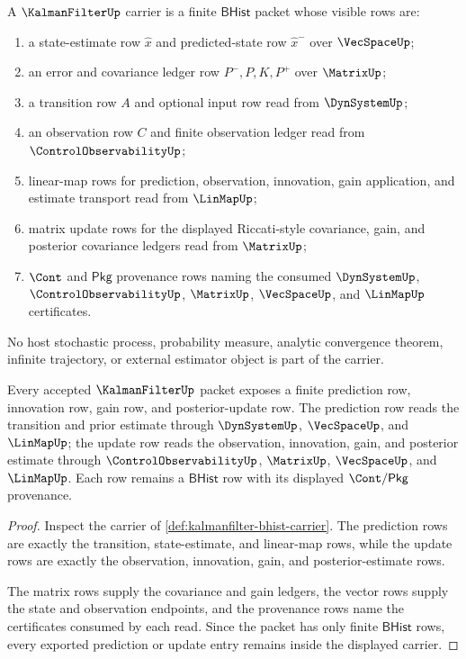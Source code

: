 \begin{definition}
\label{def:kalmanfilter-bhist-carrier}
A $\KalmanFilterUp$ carrier is a finite $\mathsf{BHist}$ packet whose visible rows are:
\begin{enumerate}
\item a state-estimate row $\widehat{x}$ and predicted-state row $\widehat{x}^{-}$ over $\VecSpaceUp$;
\item an error and covariance ledger row $P^{-},P,K,P^{+}$ over $\MatrixUp$;
\item a transition row $A$ and optional input row read from $\DynSystemUp$;
\item an observation row $C$ and finite observation ledger read from $\ControlObservabilityUp$;
\item linear-map rows for prediction, observation, innovation, gain application, and estimate transport read from $\LinMapUp$;
\item matrix update rows for the displayed Riccati-style covariance, gain, and posterior covariance ledgers read from $\MatrixUp$;
\item $\Cont$ and $\mathsf{Pkg}$ provenance rows naming the consumed $\DynSystemUp$, $\ControlObservabilityUp$, $\MatrixUp$, $\VecSpaceUp$, and $\LinMapUp$ certificates.
\end{enumerate}
No host stochastic process, probability measure, analytic convergence theorem, infinite trajectory, or external estimator object is part of the carrier.
\end{definition}

\begin{theorem}
\label{thm:kalmanfilter-prediction-update-obligation}
Every accepted $\KalmanFilterUp$ packet exposes a finite prediction row, innovation row, gain row, and posterior-update row. The prediction row reads the transition and prior estimate through $\DynSystemUp$, $\VecSpaceUp$, and $\LinMapUp$; the update row reads the observation, innovation, gain, and posterior estimate through $\ControlObservabilityUp$, $\MatrixUp$, $\VecSpaceUp$, and $\LinMapUp$. Each row remains a $\mathsf{BHist}$ row with its displayed $\Cont/\mathsf{Pkg}$ provenance.
\end{theorem}
\begin{proof}
Inspect the carrier of \autoref{def:kalmanfilter-bhist-carrier}. The prediction rows are exactly the transition, state-estimate, and linear-map rows, while the update rows are exactly the observation, innovation, gain, and posterior-estimate rows.

The matrix rows supply the covariance and gain ledgers, the vector rows supply the state and observation endpoints, and the provenance rows name the certificates consumed by each read. Since the packet has only finite $\mathsf{BHist}$ rows, every exported prediction or update entry remains inside the displayed carrier.
\end{proof}

